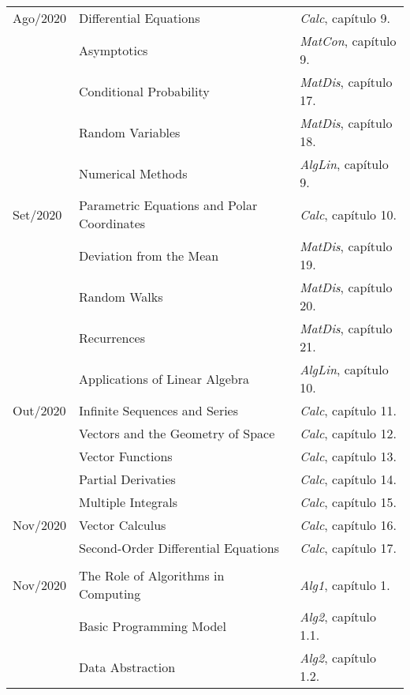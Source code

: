 \documentclass[a4paper]{inzane_syllabus} %
\begin{document}
\begin{center}
\begin{tabularx}{\textwidth}{p{2cm}p{8cm}p{9.5cm}}
\arrayrulecolor{maingray}\hline
Ago/2020 & Differential Equations   & \emph{Calc},   capítulo 9.  \\
         & Asymptotics              & \emph{MatCon}, capítulo 9.  \\
         & Conditional Probability  & \emph{MatDis}, capítulo 17. \\
         & Random Variables         & \emph{MatDis}, capítulo 18. \\
         & Numerical Methods        & \emph{AlgLin}, capítulo 9.  \\

\arrayrulecolor{maingray}\hline
Set/2020 & Parametric Equations and Polar Coordinates  & \emph{Calc},   capítulo 10. \\
         & Deviation from the Mean                     & \emph{MatDis}, capítulo 19. \\
         & Random Walks                                & \emph{MatDis}, capítulo 20. \\
         & Recurrences                                 & \emph{MatDis}, capítulo 21. \\
         & Applications of Linear Algebra              & \emph{AlgLin}, capítulo 10. \\

\arrayrulecolor{maingray}\hline
Out/2020 & Infinite Sequences and Series      & \emph{Calc}, capítulo 11. \\
         & Vectors and the Geometry of Space  & \emph{Calc}, capítulo 12. \\
         & Vector Functions                   & \emph{Calc}, capítulo 13. \\
         & Partial Derivaties                 & \emph{Calc}, capítulo 14. \\
         & Multiple Integrals                 & \emph{Calc}, capítulo 15. \\

\arrayrulecolor{maingray}\hline
Nov/2020 & Vector Calculus                      & \emph{Calc}, capítulo 16. \\
         & Second-Order Differential Equations  & \emph{Calc}, capítulo 17. \\

\arrayrulecolor{myCOLOR}\hline
\multicolumn{2}{l}{\textbf{\textcolor{myCOLOR}{\large MÓDULO 2: Algoritmos }}} \\
\hline
Nov/2020 & The Role of Algorithms in Computing  & \emph{Alg1}, capítulo 1.   \\
         & Basic Programming Model              & \emph{Alg2}, capítulo 1.1. \\
         & Data Abstraction                     & \emph{Alg2}, capítulo 1.2. \\


\end{tabularx}
\end{center}
\end{document}
